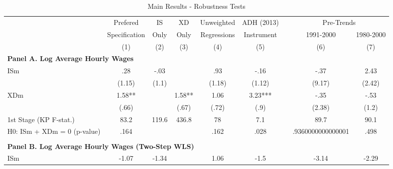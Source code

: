 \noindent \begin{center}
\begin{table}[h!]
\begin{center}
\protect\caption{\label{tab:Table_robustness}Main Results - Robustness Tests}
\begin{centering}
\begin{tabular}{lcccccc|cc}
\hline 
 & {\footnotesize{}Prefered}  & {\footnotesize{}IS} & {\footnotesize{}XD} & {\footnotesize{}Unweighted}  & {\footnotesize{}ADH (2013)} & & \multicolumn{2}{c}{{\footnotesize{}Pre-Trends}} \tabularnewline
 & {\footnotesize{}Specification} & {\footnotesize{}Only} & {\footnotesize{}Only} & {\footnotesize{}Regressions} & {\footnotesize{}Instrument} & & {\footnotesize{}1991-2000} & {\footnotesize{}1980-2000} \tabularnewline
 & {\scriptsize{}(1)} & {\scriptsize{}(2)} & {\scriptsize{}(3)} & {\scriptsize{}(4)} & {\scriptsize{}(5)} & & {\scriptsize{}(6)} & {\scriptsize{}(7)} \tabularnewline
\hline 
\multicolumn{4}{l}{\textbf{\footnotesize{}Panel A. Log Average Hourly Wages}} & & & \tabularnewline
{\footnotesize{}ISm} & {\footnotesize{} .28} & {\footnotesize{} -.03} & & {\footnotesize{} .93} & {\footnotesize{} -.16} & & {\footnotesize{} -.37} & {\footnotesize{} 2.43} \tabularnewline
                                         & {\scriptsize{}(1.15)}  & {\scriptsize{}(1.1)}  & & {\scriptsize{}(1.18)}  & {\scriptsize{}(1.12)}  & & {\scriptsize{}(9.17)}  & {\scriptsize{}(2.42)}  \tabularnewline
{\footnotesize{}XDm} & {\footnotesize{} 1.58**} & & {\footnotesize{} 1.58**} & {\footnotesize{} 1.06} & {\footnotesize{} 3.23***} & & {\footnotesize{} -.35} & {\footnotesize{} -.53} \tabularnewline
                                         & {\scriptsize{}(.66)}  & & {\scriptsize{}(.67)}  & {\scriptsize{}(.72)}  & {\scriptsize{}(.9)}  & & {\scriptsize{}(2.38)}  & {\scriptsize{}(1.2)}  \tabularnewline
{\scriptsize{}1st Stage (KP F-stat.)}      & {\scriptsize{} 83.2} & {\scriptsize{} 119.6}& {\scriptsize{} 436.8} & {\scriptsize{} 78} & {\scriptsize{} 7.1} & & {\scriptsize{} 89.7} & {\scriptsize{} 90.1} \tabularnewline
{\scriptsize{}H0: ISm + XDm = 0 (p-value)} & {\scriptsize{} .164}  & {\scriptsize{} } & {\scriptsize{} } & {\scriptsize{} .162} & {\scriptsize{} .028} & & {\scriptsize{} .9360000000000001} & {\scriptsize{} .498} \tabularnewline
 &  &  &  &  &  & \tabularnewline
\multicolumn{6}{l}{\textbf{\footnotesize{}Panel B. Log Average Hourly Wages (Two-Step WLS)}}\tabularnewline
{\footnotesize{}ISm} & {\footnotesize{} -1.07} & {\footnotesize{} -1.34} & & {\footnotesize{} 1.06} & {\footnotesize{} -1.5} & & {\footnotesize{} -3.14} & {\footnotesize{} -2.29} \tabularnewline

\end{tabular}
\end{centering}
\end{center}
\end{table}
\end{center}
